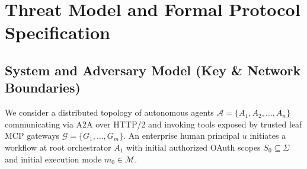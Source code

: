 \documentclass[conference,10pt]{IEEEtran}
\begin{document}
\section{Threat Model and Formal Protocol Specification}

\subsection{System and Adversary Model (Key \& Network Boundaries)}
We consider a distributed topology of autonomous agents $\mathcal{A} = \{A_1, A_2, \dots, A_n\}$ communicating via A2A over HTTP/2 and invoking tools exposed by trusted leaf MCP gateways $\mathcal{G} = \{G_1, \dots, G_m\}$. An enterprise human principal $u$ initiates a workflow at root orchestrator $A_1$ with initial authorized OAuth scopes $S_0 \subseteq \Sigma$ and initial execution mode $m_0 \in \mathcal{M}$.
\end{document}
